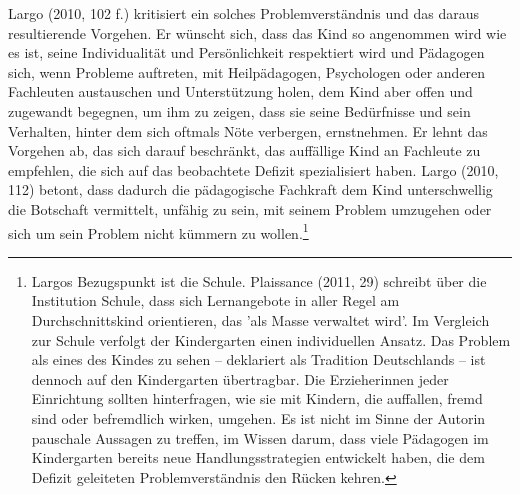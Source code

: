 Largo (2010, 102 f.) kritisiert ein solches Problemverständnis und das daraus resultierende Vorgehen. Er wünscht sich, dass das Kind so angenommen wird wie es ist, seine Individualität und Persönlichkeit respektiert wird und Pädagogen sich, wenn Probleme auftreten, mit Heilpädagogen, Psychologen oder anderen Fachleuten austauschen und Unterstützung holen, dem Kind aber offen und zugewandt begegnen, um ihm zu zeigen, dass sie seine Bedürfnisse und sein Verhalten, hinter dem sich oftmals Nöte verbergen, ernstnehmen. Er lehnt das Vorgehen ab, das sich darauf beschränkt, das auffällige Kind an Fachleute zu empfehlen, die sich auf das beobachtete Defizit spezialisiert haben. Largo (2010, 112) betont, dass dadurch die pädagogische Fachkraft dem Kind  unterschwellig die Botschaft vermittelt, unfähig zu sein, mit seinem Problem umzugehen oder sich um sein Problem nicht kümmern zu wollen.\footnote{Largos Bezugspunkt ist die Schule. Plaissance (2011, 29) schreibt über die Institution Schule, dass sich Lernangebote in aller Regel am Durchschnittskind orientieren, das 'als Masse verwaltet wird'. Im Vergleich zur Schule verfolgt der Kindergarten einen individuellen Ansatz. Das Problem als eines des Kindes zu sehen -- deklariert als Tradition Deutschlands -- ist dennoch auf den Kindergarten übertragbar. Die Erzieherinnen jeder Einrichtung sollten hinterfragen, wie sie mit Kindern, die auffallen, fremd sind oder befremdlich wirken, umgehen. Es ist nicht im Sinne der Autorin pauschale Aussagen zu treffen, im Wissen darum, dass viele Pädagogen im Kindergarten bereits neue Handlungsstrategien entwickelt haben, die dem Defizit geleiteten Problemverständnis den Rücken kehren.} 

